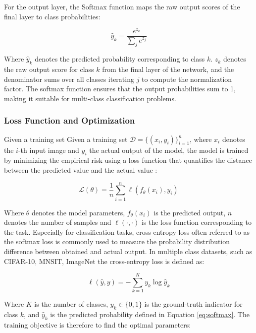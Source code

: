 For the output layer, the Softmax function maps the  
raw output scores of the final layer to class probabilities:

\begin{equation}
\hat{y}_k = \frac{e^{z_k}}{\sum_{j} e^{z_j}}
\label{eq:softmax}
\end{equation}

Where $\hat{y}_k $ denotes the predicted probability corresponding to class $k$.
${z_k}$ denotes the raw output score for class $k$ from the final layer of the network, and the denominator sums over all classes iterating $j$ to compute the normalization factor. The softmax function ensures that the output probabilities sum to 1, making it suitable for multi-class classification problems. 

\subsubsection{Loss Function and Optimization}

Given a training set Given a training set $\mathcal{D} = \{(x_i, y_i)\}_{i=1}^n$, 
where $x_i$ denotes the $i$-th input image and $y_i$ the actual output of the model, the model is trained by minimizing the empirical risk using a loss function
that quantifies the distance between the predicted value and the actual value :

\begin{equation}
\mathcal{L}(\theta) = \frac{1}{n} \sum_{i=1}^{n} 
\ell(f_\theta(x_i), y_i)
\label{eq:empiricalrisk}
\end{equation}

Where $\theta$ denotes the model parameters, $f_\theta(x_i)$ 
is the predicted output, $n$ denotes the number of samples and $\ell(\cdot, \cdot)$ is the loss 
function corresponding to the task. Especially for classification tasks, cross-entropy loss often referred to as the softmax loss is commonly used to measure the probability distribution
difference between obtained and actual output. \cite{Li2020ASO} In multiple class datasets, such as CIFAR-10, MNSIT, ImageNet the cross-entropy loss is defined as:

\begin{equation}
\ell(\hat{y}, y) = -\sum_{k=1}^{K} y_k \log \hat{y}_k
\label{eq:crossentropy}
\end{equation}

Where $K$ is the number of classes, $y_k \in \{0,1\}$ is the 
ground-truth indicator for class $k$, and $\hat{y}_k$ is the 
predicted probability defined in Equation \ref{eq:softmax}. 
The training objective is therefore to find the optimal 
parameters:

